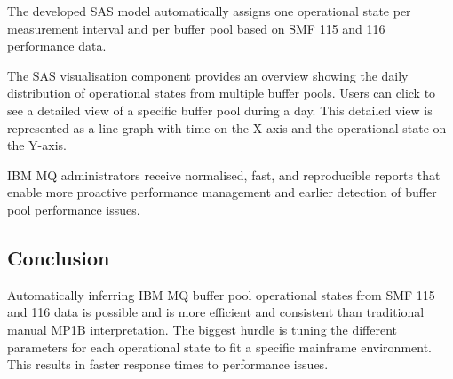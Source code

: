The developed SAS model automatically assigns one operational state per measurement interval and per buffer pool based on SMF 115 and 116 performance data.

The SAS visualisation component provides an overview showing the daily distribution of operational states from multiple buffer pools. Users can click to see a detailed view of a specific buffer pool during a day. This detailed view is represented as a line graph with time on the X-axis and the operational state on the Y-axis.

IBM MQ administrators receive normalised, fast, and reproducible reports that enable more proactive performance management and earlier detection of buffer pool performance issues.

\subsection{Conclusion}
Automatically inferring IBM MQ buffer pool operational states from SMF 115 and 116 data is possible and is more efficient and consistent than traditional manual MP1B interpretation. The biggest hurdle is tuning the different parameters for each operational state to fit a specific mainframe environment. This results in faster response times to performance issues.

